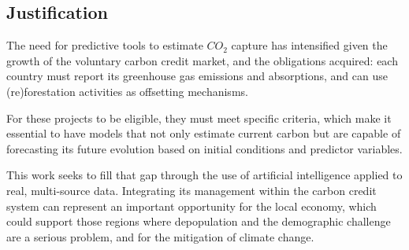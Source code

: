 \subsection{Justification}

The need for predictive tools to estimate \(CO_2\) capture has intensified given the growth of the voluntary carbon credit market, and the obligations acquired: each country must report its greenhouse gas emissions and absorptions, and can use (re)forestation activities as offsetting mechanisms.

For these projects to be eligible, they must meet specific criteria, which make it essential to have models that not only estimate current carbon but are capable of forecasting its future evolution based on initial conditions and predictor variables.

This work seeks to fill that gap through the use of artificial intelligence applied to real, multi-source data. Integrating its management within the carbon credit system can represent an important opportunity for the local economy, which could support those regions where depopulation and the demographic challenge are a serious problem, and for the mitigation of climate change.


